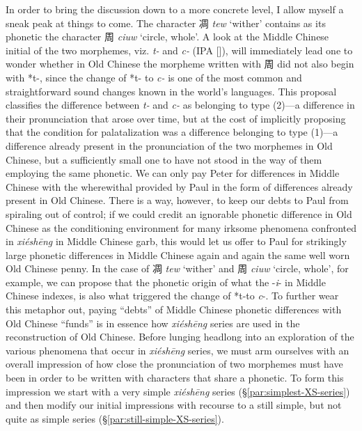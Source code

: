 In order to bring the discussion down to a more concrete level, I allow myself a sneak peak at things to come. The character 凋 \emph{tew} `wither'  contains as its phonetic the character 周 \emph{ciuw} `circle, whole'. A look at the Middle Chinese initial of the two morphemes, viz. \textit{t-}
and \textit{c-} (IPA [{}]), will immediately lead one to wonder whether in Old Chinese the morpheme written with 周 did not also begin with *t-, since the change of *t- to \textit{c-} is one of the most common and straightforward sound changes known in the world's languages. This proposal classifies the difference between  \textit{t-}
and \textit{c-} as belonging to type (2)---a difference in their pronunciation that arose over time, but at the cost of implicitly proposing that the condition for palatalization was a difference belonging to type (1)---a difference already present in the pronunciation of the two morphemes in Old Chinese, but a sufficiently small one to have not stood in the way of them employing the same phonetic. We can only pay Peter for differences in Middle Chinese with the wherewithal provided by Paul in the form of differences already present in Old Chinese. 
There is a way, however, to keep our debts to Paul from spiraling out of control; if we could credit an ignorable phonetic difference in Old Chinese as the conditioning environment for many irksome phenomena confronted in \textit{xiéshēng} in Middle Chinese garb, this would let us offer to Paul for strikingly large phonetic differences in Middle Chinese again and again the same well worn Old Chinese penny. 
In the case of 凋 \emph{tew} `wither'  and 周 \emph{ciuw} `circle, whole', for example, 
we can propose that the phonetic origin of what the -\textit{i}- in Middle Chinese indexes, is also what triggered the change of *t-to \textit{c}-. 
To further wear this metaphor out, paying ``debts'' of Middle Chinese phonetic differences with Old Chinese ``funds'' is in essence how \textit{xiéshēng} series are used in the reconstruction of Old Chinese. Before lunging headlong into an exploration of the various phenomena that occur in \textit{xiéshēng} series, we must arm ourselves with an overall impression of how close the pronunciation of two morphemes must have been in order to be written with characters that share a phonetic. To form this impression we start with a very simple \textit{xiéshēng} series (§\ref{par:simplest-XS-series}) and then modify our initial impressions with recourse to a still simple, but not quite as simple series (§\ref{par:still-simple-XS-series}).

